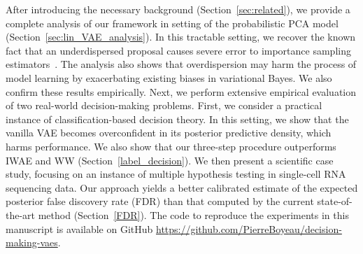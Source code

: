 After introducing the necessary background (Section~\ref{sec:related}),
we provide a complete analysis of our framework in setting of the probabilistic PCA model~\cite{Bishop:2006:PRM:1162264} (Section~\ref{sec:lin_VAE_analysis}). 
In this tractable setting, we recover the known fact that an underdispersed proposal causes severe error to importance sampling estimators~\cite{pmlr-v80-yao18a}. The analysis also shows that overdispersion may harm the process of model learning by exacerbating existing biases in variational Bayes. We also confirm these results empirically. Next, we perform extensive empirical evaluation of two real-world decision-making problems. 
First, we consider a practical instance of classification-based decision
theory. 
In this setting, we show that the vanilla VAE becomes overconfident in its posterior predictive density, which harms performance. We also show that our three-step procedure outperforms IWAE and WW (Section~\ref{label_decision}).
We then present a scientific case study, focusing on an instance of multiple hypothesis testing in single-cell RNA sequencing data. Our approach yields a better calibrated estimate of the expected posterior false discovery rate (FDR) than that computed by the current state-of-the-art method (Section~\ref{FDR}). The code to reproduce the experiments in this manuscript is available on GitHub \url{https://github.com/PierreBoyeau/decision-making-vaes}.